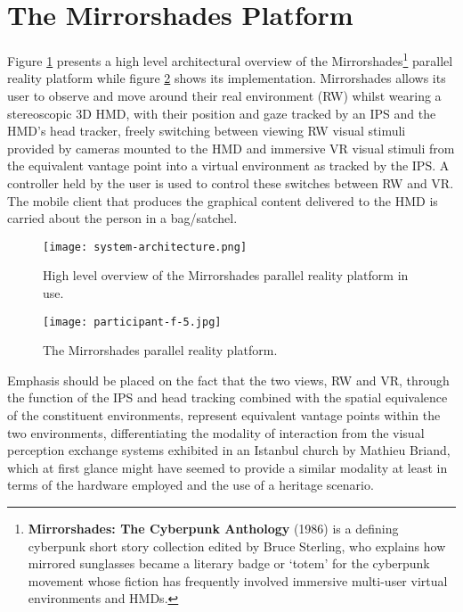 
\section{The Mirrorshades Platform}
\label{the-mirrorshades-platform}
Figure \ref{systemarchitecture} presents a high level architectural overview of the Mirrorshades\footnote{\textbf{Mirrorshades: The Cyberpunk Anthology} (1986) is a defining cyberpunk short story collection edited by Bruce Sterling, who explains how mirrored sunglasses became a literary badge or `totem' for the cyberpunk movement whose fiction has frequently involved immersive multi-user virtual environments and HMDs.} parallel reality platform while figure \ref{participant-f-5.jpg} shows its implementation. Mirrorshades allows its user to observe and move around their real environment (RW) whilst wearing a stereoscopic 3D HMD, with their position and gaze tracked by an IPS and the HMD's head tracker, freely switching between viewing RW visual stimuli provided by cameras mounted to the HMD and immersive VR visual stimuli from the equivalent vantage point into a virtual environment as tracked by the IPS. A controller held by the user is used to control these switches between RW and VR. The mobile client that produces the graphical content delivered to the HMD is carried about the person in a bag/satchel.

\begin{figure}[h]
	\begin{center}
		\texttt{[image: system-architecture.png]}
		\caption{High level overview of the Mirrorshades parallel reality platform in use.}
		\label{systemarchitecture}
	\end{center}
\end{figure}

\begin{figure}[h]
	\begin{center}
		\texttt{[image: participant-f-5.jpg]}
		\caption{The Mirrorshades parallel reality platform.}
		\label{participant-f-5.jpg}
	\end{center}
\end{figure}

Emphasis should be placed on the fact that the two views, RW and VR, through the function of the IPS and head tracking combined with the spatial equivalence of the constituent environments, represent equivalent vantage points within the two environments, differentiating the modality of interaction from the visual perception exchange systems exhibited in an Istanbul church by Mathieu Briand, which at first glance might have seemed to provide a similar modality at least in terms of the hardware employed and the use of a heritage scenario.

